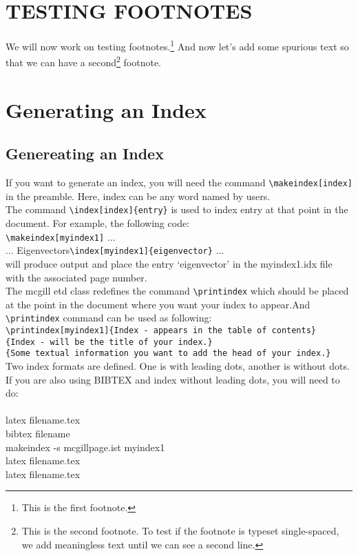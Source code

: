 \documentclass[12pt,Bold,letterpaper,TexShade]{mcgilletdclass}
\begin{document}
\newpage



\chapter{TESTING FOOTNOTES}
We will now work on testing footnotes.\footnote{This is the first footnote.}
And now let's add some spurious text so that we can have a second\footnote{This
is the second footnote. To test if the footnote is typeset single-spaced, 
we add meaningless text until we can see a second line.} footnote.

\chapter{Generating an Index}
\section{Genereating an Index}
If you want to generate an index, you will need the command \verb=\makeindex[index]= in the 
preamble. Here, index can be any word named by users.\\

The command \verb=\index[index]{entry}= is used to index entry at that point in the document. 
For example, the following code:\\
	\verb=\makeindex[myindex1]= ...\\%
	... Eigenvectors\verb=\index[myindex1]{eigenvector}= ...\\%
will produce output and place the entry `eigenvector' in the myindex1.idx file with the associated page number.\\%

The mcgill etd class redefines the command \verb=\printindex= which should be placed at the point %
in the document where you want your index to appear.And \verb=\printindex= command can be used as following:\\%
  \verb=\printindex[myindex1]{Index - appears in the table of contents}=\\%
  \verb={Index - will be the title of your index.}= \\%
  \verb={Some textual information you want to add the head of your index.}=\\%

Two index formats are defined. One is with leading dots, another is without dots.
If you are also using BIBTEX and index without leading dots, you will need to do:\\
\\
latex filename.tex\\
bibtex filename\\
makeindex -s mcgillpage.ist myindex1 \\
latex filename.tex\\
latex filename.tex\\
\end{document}
